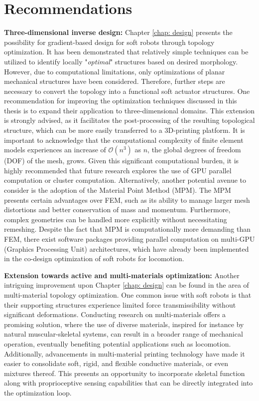 \section[Recommendations]{Recommendations}
\textbf{Three-dimensional inverse design:}  Chapter \ref{chap: design} presents the possibility for gradient-based design for soft robots through topology optimization. It has been demonstrated that relatively simple techniques can be utilized to identify locally "\textit{optimal}" structures based on desired morphology. However, due to computational limitations, only optimizations of planar mechanical structures have been considered. Therefore, further steps are necessary to convert the topology into a functional soft actuator structures. One recommendation for improving the optimization techniques discussed in this thesis is to expand their application to three-dimensional domains. This extension is strongly advised, as it facilitates the post-processing of the resulting topological structure, which can be more easily transferred to a 3D-printing platform. It is important to acknowledge that the computational complexity of finite element models experiences an increase of $\mathcal{O}(n^3)$ as $n$, the global degrees of freedom (DOF) of the mesh, grows. Given this significant computational burden, it is highly recommended that future research explores the use of GPU parallel computation or cluster computation. Alternatively, another potential avenue to consider is the adoption of the Material Point Method (MPM). The MPM presents certain advantages over FEM, such as its ability to manage larger mesh distortions and better conservation of mass and momentum. Furthermore, complex geometries can be handled more explicitly without necessitating remeshing. Despite the fact that MPM is computationally more demanding than FEM, there exist software packages providing parallel computation on multi-GPU (Graphics Processing Unit) architectures, which have already been implemented in the co-design optimization of soft robots for locomotion.

\textbf{Extension towards active and multi-materials optimization:} Another intriguing improvement upon Chapter \ref{chap: design} can be found in the area of multi-material topology optimization. One common issue with soft robots is that their supporting structures experience limited force transmissibility without significant deformations. Conducting research on multi-materials offers a promising solution, where the use of diverse materials, inspired for instance by natural muscular-skeletal systems, can result in a broader range of mechanical operation, eventually benefiting potential applications such as locomotion. Additionally, advancements in multi-material printing technology have made it easier to consolidate soft, rigid, and flexible conductive materials, or even mixtures thereof. This presents an opportunity to incorporate skeletal function along with proprioceptive sensing capabilities that can be directly integrated into the optimization loop.

